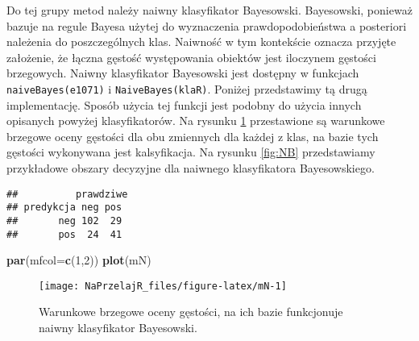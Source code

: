 \documentclass[polish,]{book}
\newenvironment{Shaded}{\begin{snugshade}}{\end{snugshade}}
\newcommand{\CommentTok}[1]{\textcolor[rgb]{0.56,0.35,0.01}{\textit{#1}}}
\newcommand{\DataTypeTok}[1]{\textcolor[rgb]{0.13,0.29,0.53}{#1}}
\newcommand{\DecValTok}[1]{\textcolor[rgb]{0.00,0.00,0.81}{#1}}
\newcommand{\KeywordTok}[1]{\textcolor[rgb]{0.13,0.29,0.53}{\textbf{#1}}}
\newcommand{\NormalTok}[1]{#1}
\newcommand{\OperatorTok}[1]{\textcolor[rgb]{0.81,0.36,0.00}{\textbf{#1}}}
\newcommand{\StringTok}[1]{\textcolor[rgb]{0.31,0.60,0.02}{#1}}
\begin{document}
Do tej grupy metod należy naiwny klasyfikator Bayesowski. Bayesowski, ponieważ bazuje na regule Bayesa użytej do wyznaczenia prawdopodobieństwa a posteriori
należenia do poszczególnych klas. Naiwność w tym kontekście oznacza przyjęte założenie, że łączna gęstość występowania obiektów jest iloczynem gęstości brzegowych.
Naiwny klasyfikator Bayesowski jest dostępny w funkcjach \texttt{naiveBayes(e1071)} i \texttt{NaiveBayes(klaR)}.
Poniżej przedstawimy tą drugą implementację.
Sposób użycia tej funkcji jest podobny do użycia innych opisanych powyżej klasyfikatorów. Na rysunku \ref{fig:mN} przestawione są warunkowe brzegowe oceny gęstości dla
obu zmiennych dla każdej z klas, na bazie tych gęstości wykonywana jest kalsyfikacja. Na rysunku \ref{fig:NB} przedstawiamy przykładowe obszary decyzyjne dla naiwnego klasyfikatora Bayesowskiego.

\begin{Shaded}
\end{Shaded}

\begin{verbatim}
##          prawdziwe
## predykcja neg pos
##       neg 102  29
##       pos  24  41
\end{verbatim}

\begin{Shaded}
\begin{Highlighting}[]
\KeywordTok{par}\NormalTok{(}\DataTypeTok{mfcol=}\KeywordTok{c}\NormalTok{(}\DecValTok{1}\NormalTok{,}\DecValTok{2}\NormalTok{))}
\KeywordTok{plot}\NormalTok{(mN)}
\end{Highlighting}
\end{Shaded}

\begin{figure}[h]

{\centering \texttt{[image: NaPrzelajR\_files/figure-latex/mN-1]} 

}

\caption{Warunkowe brzegowe oceny gęstości, na ich bazie funkcjonuje naiwny klasyfikator Bayesowski.}\label{fig:mN}
\end{figure}
\end{document}
